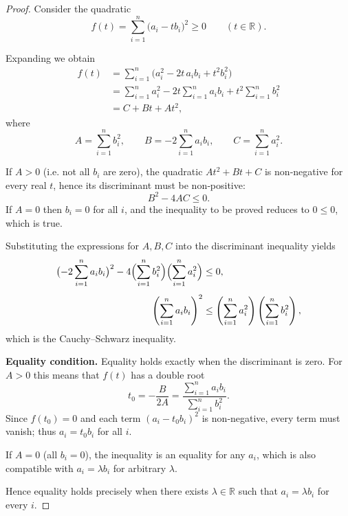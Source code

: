 \begin{proof}
Consider the quadratic
\[
f(t)=\sum_{i=1}^{n}\bigl(a_i-t b_i\bigr)^2\ge 0\qquad(t\in\mathbb R).
\]

Expanding we obtain
\begin{align*}
f(t)&=\sum_{i=1}^{n}\bigl(a_i^{2}-2t\,a_i b_i+t^{2}b_i^{2}\bigr)\\
    &=\sum_{i=1}^{n}a_i^{2}-2t\sum_{i=1}^{n}a_i b_i
      +t^{2}\sum_{i=1}^{n}b_i^{2}\\
    &=C+Bt+At^{2},
\end{align*}
where
\[
A=\sum_{i=1}^{n}b_i^{2},\qquad
B=-2\sum_{i=1}^{n}a_i b_i,\qquad
C=\sum_{i=1}^{n}a_i^{2}.
\]

If $A>0$ (i.e. not all $b_i$ are zero), the quadratic $At^{2}+Bt+C$ is non‑negative for every real $t$, hence its discriminant must be non‑positive:
\[
B^{2}-4AC\le 0.
\]
If $A=0$ then $b_i=0$ for all $i$, and the inequality to be proved reduces to $0\le0$, which is true.

Substituting the expressions for $A,B,C$ into the discriminant inequality yields
\begin{align*}
\bigl(-2\sum_{i=1}^{n}a_i b_i\bigr)^{2}
-4\Bigl(\sum_{i=1}^{n}b_i^{2}\Bigr)
   \Bigl(\sum_{i=1}^{n}a_i^{2}\Bigr)&\le 0,\\[4pt]
\left(\sum_{i=1}^{n}a_i b_i\right)^{2}
&\le\left(\sum_{i=1}^{n}a_i^{2}\right)
   \left(\sum_{i=1}^{n}b_i^{2}\right),
\end{align*}
which is the Cauchy–Schwarz inequality.

\medskip
\textbf{Equality condition.} Equality holds exactly when the discriminant is zero.  
For $A>0$ this means that $f(t)$ has a double root
\[
t_{0}=-\frac{B}{2A}
     =\frac{\sum_{i=1}^{n}a_i b_i}{\sum_{i=1}^{n}b_i^{2}}.
\]
Since $f(t_{0})=0$ and each term $(a_i-t_{0}b_i)^{2}$ is non‑negative, every term must vanish; thus $a_i=t_{0}b_i$ for all $i$.  

If $A=0$ (all $b_i=0$), the inequality is an equality for any $a_i$, which is also compatible with $a_i=\lambda b_i$ for arbitrary $\lambda$.

Hence equality holds precisely when there exists $\lambda\in\mathbb R$ such that $a_i=\lambda b_i$ for every $i$.
\end{proof}